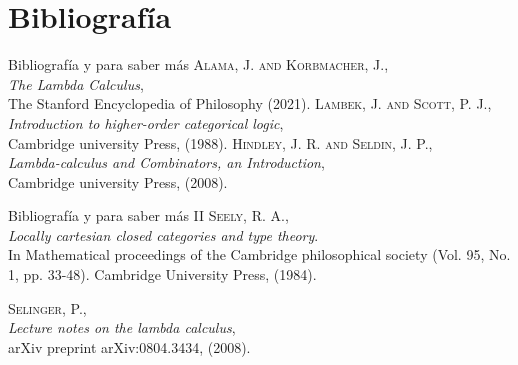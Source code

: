 \documentclass[usenames,dvipsnames]{beamer}
\begin{document}
 \section{Bibliografía}
\begin{thebibliography}{9}


\begin{frame}{Bibliografía y para saber más}
  \textsc{Alama, J. and Korbmacher, J.},\\ \textit{The Lambda Calculus}, \\ The Stanford Encyclopedia of Philosophy (2021).
\textsc{Lambek, J. and Scott, P. J.},\\ \textit{Introduction to higher-order categorical logic},\\ Cambridge university Press, (1988).
  \textsc{Hindley, J. R. and Seldin, J. P.},\\ \textit{Lambda-calculus and Combinators, an Introduction},\\ Cambridge university Press, (2008).
\end{frame}{}
\begin{frame}{Bibliografía y para saber más II}
\textsc{Seely, R. A.},\\ \textit{Locally cartesian closed categories and type theory}.\\ In Mathematical proceedings of the Cambridge philosophical society (Vol. 95, No. 1, pp. 33-48). Cambridge University Press, (1984).

\textsc{Selinger, P.},\\ \textit{Lecture notes on the lambda calculus},\\  arXiv preprint arXiv:0804.3434, (2008).

\end{frame}{}


\end{thebibliography}
 
\end{document}
